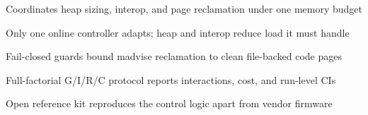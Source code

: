 \begin{highlights}
\item Coordinates heap sizing, interop, and page reclamation under one memory budget
\item Only one online controller adapts; heap and interop reduce load it must handle
\item Fail-closed guards bound madvise reclamation to clean file-backed code pages
\item Full-factorial G/I/R/C protocol reports interactions, cost, and run-level CIs
\item Open reference kit reproduces the control logic apart from vendor firmware
\end{highlights}
